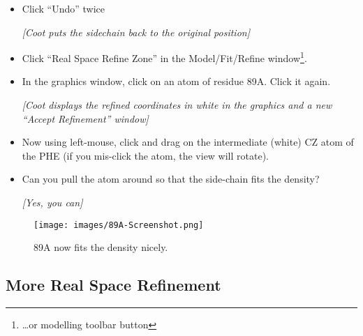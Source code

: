 \documentclass{article}
\begin{document}
\begin{itemize}
\item Click \textsf{``Undo''} twice

  \textsl{ [Coot puts the sidechain back to the original position] } 
  
\item Click \textsf{``Real Space Refine Zone''} in the
  Model/Fit/Refine window\footnote{\ldots or modelling toolbar button}.
  
\item In the graphics window, click on an atom of residue 89A.  Click
  it again.

  \textsl{ [Coot displays the refined coordinates in white in the
    graphics and a new ``Accept Refinement'' window]}
  
\item Now using left-mouse, click and drag on the intermediate (white)
  CZ atom of the PHE (if you mis-click the atom, the view will
  rotate).
  
\item Can you pull the atom around so that the side-chain fits the
  density?

  \emph{ [Yes, you can] } 

\end{itemize}
  
  \begin{figure}[htbp]
    \begin{center}
      \leavevmode
      \texttt{[image: images/89A-Screenshot.png]}
      \caption{89A now fits the density nicely.}
      \label{fig:89a-coot}
    \end{center}
  \end{figure}

\subsection{More Real Space Refinement}
\end{document}
